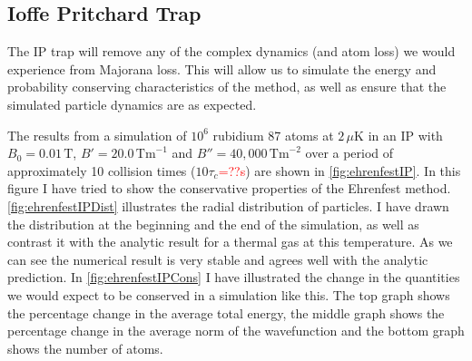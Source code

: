 \subsection{Ioffe Pritchard Trap} \label{sec:EhrenfestIP}

The IP trap will remove any of the complex dynamics (and atom loss) we would experience from Majorana loss.
This will allow us to simulate the energy and probability conserving characteristics of the method, as well as ensure that the simulated particle dynamics are as expected.


The results from a simulation of $10^6$ rubidium 87 atoms at $2\,\mu\mathrm{K}$ in an IP with $B_0=0.01\,\mathrm{T}$, $B'=20.0\,\mathrm{Tm}^{-1}$ and $B''=40,000\,\mathrm{Tm}^{-2}$ over a period of approximately 10 collision times ($10\tau_c$\textcolor{red}{=??s}) are shown in \autoref{fig:ehrenfestIP}.
In this figure I have tried to show the conservative properties of the Ehrenfest method.
\autoref{fig:ehrenfestIPDist} illustrates the radial distribution of particles.
I have drawn the distribution at the beginning and the end of the simulation, as well as contrast it with the analytic result for a thermal gas at this temperature.
As we can see the numerical result is very stable and agrees well with the analytic prediction.
In \autoref{fig:ehrenfestIPCons} I have illustrated the change in the quantities we would expect to be conserved in a simulation like this.
The top graph shows the percentage change in the average total energy, the middle graph shows the percentage change in the average norm of the wavefunction and the bottom graph shows the number of atoms.

